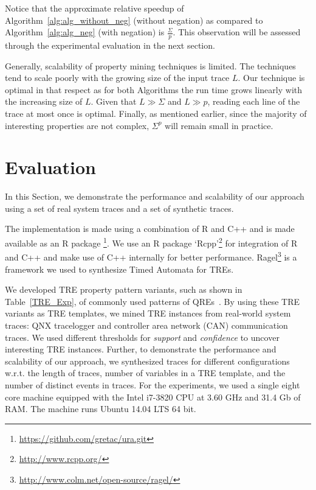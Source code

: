 \documentclass[]{sigplanconf}
\begin{document}
Notice that the approximate relative speedup of Algorithm~\ref{alg:alg_without_neg} (without negation) as compared to Algorithm~\ref{alg:alg_neg} (with negation) is $\frac{\Sigma}{p}$. This observation will be assessed through the experimental evaluation in the next section.


Generally, scalability of property mining techniques is limited.
The techniques tend to scale poorly with the growing size of the input trace $L$. Our technique is optimal in that respect as for both Algorithms the run time grows linearly with the increasing size of $L$. Given that $L \gg \Sigma$ and $L \gg p$, reading each line of the trace at most once is optimal.
Finally, as mentioned earlier, since the majority of interesting properties are not complex, $\Sigma^p$ will remain small in practice.


\section{Evaluation}

In this Section, we demonstrate the performance and scalability of our approach using a set of real system traces and a set of synthetic traces.

The implementation is made using a combination of R and C++ and is made available as an R package \footnote{\url{https://github.com/gretac/ura.git}}. We use an R package `Rcpp'\footnote{\url{http://www.rcpp.org/}} for integration of R and C++ and make use of C++ internally for better performance. Ragel\footnote{\url{http://www.colm.net/open-source/ragel/}} is a framework we used to synthesize Timed Automata for TREs.

We developed TRE property pattern variants, such as shown in Table~\ref{TRE_Exp}, of commonly used patterns of QREs~\cite{evans1}. By using these TRE variants as TRE templates, we mined TRE instances from real-world system traces: QNX tracelogger and controller area network (CAN) communication traces. We used different thresholds for \emph{support} and \emph{confidence} to uncover interesting TRE instances. Further, to demonstrate the performance and scalability of our approach, we synthesized traces for different configurations w.r.t. the length of traces, number of variables in a TRE template, and the number of distinct events in traces. For the experiments, we used a single eight core machine equipped with the Intel i7-3820 CPU at 3.60 GHz and 31.4 Gb of RAM. The machine runs Ubuntu 14.04 LTS 64 bit.
\end{document}
